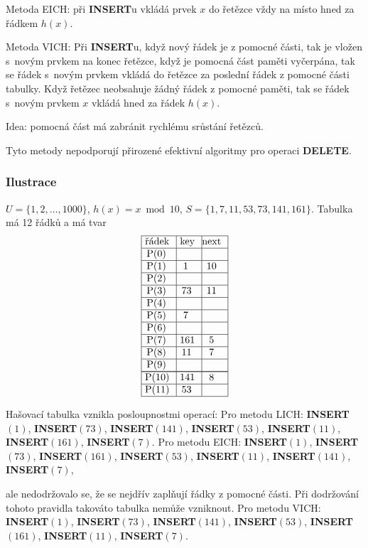 \documentclass[a4paper,12pt]{article}
\begin{document}
Metoda EICH: při {\bf INSERT}u vkládá prvek $x$ do řetězce vždy 
na místo hned za řádkem $h(x)$.
 
Metoda VICH: Při {\bf INSERT}u, když nový řádek je z 
pomocné části, tak je vložen s~novým prvkem na konec 
řetězce, když je pomocná část paměti vyčer\-pá\-na, tak se 
řádek s~novým prvkem vkládá do řetězce za posled\-ní 
řádek z pomocné části tabulky. Když řetězec neobsahuje 
žádný řádek z pomocné paměti, tak se řádek s~novým  prvkem $
x$ vkládá hned za řádek $h(x)$. 

Idea: pomocná část má zabránit rychlému 
srůstání řetězců.

Tyto metody nepodporují přirozené efektivní algoritmy 
pro ope\-raci {\bf DELETE}.

\subsubsection{Ilustrace} $U=\{1,2,\dots,1000\}$, $h(x)=x\bmod10$,\newline 
$S=\{1,7,11,53,73,141,161\}$. Tabulka má 12 řádků a 
má tvar
$$\vtop{\offinterlineskip\halign {\strut\vrule\ # & \vrule\ # & \vrule \hfil # \hfil \vrule\cr\noalign{\hrule}řádek & key & next \hfil \cr\noalign{\hrule}P(0) & &\hfill \cr\noalign{\hrule}P(1) & 1 & 10 \cr\noalign{\hrule}P(2) & &\hfill \cr\noalign{\hrule}P(3) & 73 & 11 \cr\noalign{\hrule}P(4) &  &\hfill \cr\noalign{\hrule}P(5) & 7 & \hfill \cr\noalign{\hrule}P(6) & &\hfill \cr\noalign{\hrule}P(7) & 161 & 5 \cr\noalign{\hrule}P(8) & 11 & 7 \cr\noalign{\hrule}P(9) & &\hfill \cr\noalign{\hrule}\noalign{\hrule}P(10) & 141 & 8 \cr\noalign{\hrule}P(11) & 53 & \cr\noalign{\hrule}}}$$

Hašovací tabulka vznikla posloupnostmi operací:\newline 
Pro metodu LICH:\newline 
{\bf INSERT$(1)$}, {\bf INSERT$(73)$}, {\bf INSERT$(141)$}, 
{\bf INSERT$(53)$}, {\bf INSERT$(11)$},\newline 
{\bf INSERT$(161)$}, {\bf INSERT$(7)$}.\newline 
Pro metodu EICH:\newline 
{\bf INSERT$(1)$}, {\bf INSERT$(73)$}, {\bf INSERT$(161)$}, 
{\bf INSERT$(53)$}, {\bf INSERT$(11)$},\newline 
{\bf INSERT$(141)$}, {\bf INSERT$(7)$},

ale nedodržovalo se, že se nejdřív zaplňují řádky z 
pomocné části.  Při dodržování tohoto pravidla takováto tabulka 
nemůže vznik\-nout.\newline 
Pro metodu VICH:\newline 
{\bf INSERT$(1)$}, {\bf INSERT$(73)$}, {\bf INSERT$(141)$}, 
{\bf INSERT$(53)$}, {\bf INSERT$(161)$},\newline 
{\bf INSERT$(11)$}, {\bf INSERT$(7)$}. 
\end{document}
